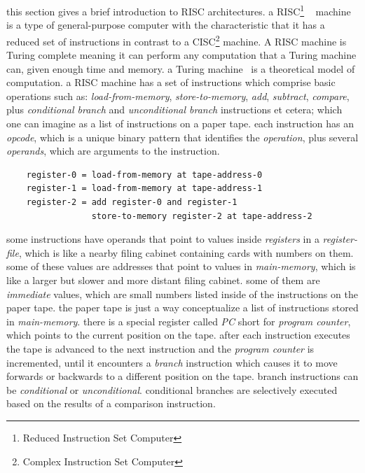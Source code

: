 this section gives a brief introduction to RISC architectures.
\para
a RISC\footnote{Reduced Instruction Set Computer}%
~\cite{radin1982ibm801,patterson1980risc,patterson1994cod} machine is a type of
general-purpose computer with the characteristic that it has a reduced
set of instructions in contrast to a CISC\footnote{Complex Instruction
Set Computer} machine. A RISC machine is Turing complete meaning it can
perform any computation that a Turing machine can, given enough time and
memory. a Turing machine~\cite{Turing1936} is a theoretical model of
computation.
\para
a RISC machine has a set of instructions which comprise basic operations
such as: \emph{load-from-memory}, \emph{store-to-memory}, \emph{add},
\emph{subtract}, \emph{compare}, plus \emph{conditional branch} and
\emph{unconditional branch} instructions et cetera; which one can imagine
as a list of instructions on a paper tape. each instruction has an
\emph{opcode}, which is a unique binary pattern that identifies the
\emph{operation}, plus several \emph{operands}, which are arguments
to the instruction.

\begin{Verbatim}
    register-0 = load-from-memory at tape-address-0
    register-1 = load-from-memory at tape-address-1
    register-2 = add register-0 and register-1
                 store-to-memory register-2 at tape-address-2 
\end{Verbatim}

\par\noindent
some instructions have operands that point to values inside \emph{registers}
in a \emph{register-file}, which is like a nearby filing cabinet containing
cards with numbers on them. some of these values are addresses that point
to values in \emph{main-memory}, which is like a larger but slower and more
distant filing cabinet. some of them are \emph{immediate} values, which are
small numbers listed inside of the instructions on the paper tape.
\para
the paper tape is just a way conceptualize a list of instructions stored
in \emph{main-memory}. there is a special register called \emph{PC} short
for \emph{program counter}, which points to the current position on the
tape. after each instruction executes the tape is advanced to the next
instruction and the \emph{program counter} is incremented, until it
encounters a \emph{branch} instruction which causes it to move forwards
or backwards to a different position on the tape. branch instructions can
be \emph{conditional} or \emph{unconditional}. conditional branches are
selectively executed based on the results of a comparison instruction.

